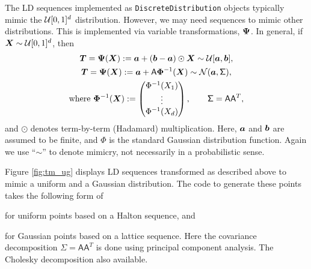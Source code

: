 \documentclass[graybox,footinfo]{svmult}
\newcommand{\mA}{\mathsf{A}}
\newcommand{\mSigma}{\mathsf{\Sigma}}
\begin{document}
The LD sequences implemented as \texttt{DiscreteDistribution} objects typically mimic the ${\mathcal{U}}[0,1]^d$ distribution.  However, we may need sequences to mimic other distributions.  This is implemented via variable transformations, ${\boldsymbol{\Psi}}$.  In general, if ${\boldsymbol{X}} \sim {\mathcal{U}}[0,1]^d$, then
\begin{subequations} \label{eq:exampleVarTrans}
\begin{gather}
\bsT = \bsPsi(\bsX) := \bsa  + (\bsb - \bsa) \odot \bsX \sim  \calU[\bsa,\bsb], \\
\label{eq:exampleVarTransGauss}
\bsT = \bsPsi(\bsX) := \bsa + \mA \bsPhi^{-1}(\bsX)  \sim \calN(\bsa, \mSigma), \\
\nonumber  \text{where }  \bsPhi^{-1}(\bsX) : = \begin{pmatrix} \Phi^{-1}(X_1) \\ \vdots \\ \Phi^{-1}(X_d)\end{pmatrix}, \qquad \mSigma = \mA \mA^T,
\end{gather}
\end{subequations}
and $\odot$ denotes term-by-term (Hadamard) multiplication.  Here, ${\boldsymbol{a}}$ and ${\boldsymbol{b}}$ are assumed to be finite, and $\Phi$ is the standard Gaussian distribution function.  Again we use ``$\sim$'' to denote mimicry, not necessarily in a probabilistic sense.

Figure \ref{fig:tm_ug} displays LD sequences transformed as described above to mimic a uniform and a Gaussian distribution.  The code to generate these points takes the following form of 

for uniform points based on a Halton sequence, and 

for Gaussian points based on a lattice sequence. Here the covariance decomposition $\mSigma = \mA \mA^T$ is done using principal component analysis. The Cholesky decomposition also available.
\end{document}
